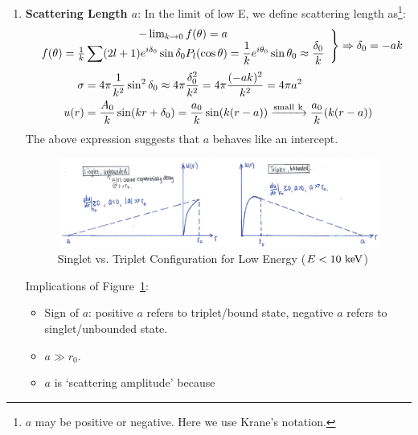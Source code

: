 \documentclass{school-22.101-notes}
\begin{document}
\begin{enumerate}
\item \textbf{Scattering Length $a$}: In the limit of low E, we define scattering length as\footnote{$a$ may be positive or negative. Here we use Krane's notation.}:
\begin{align}
\left. \begin{array}{c}
- \lim_{k\to 0} f(\theta) = a  \\
f(\theta) = \frac{1}{k} \displaystyle\sum (2l+1) e^{i \delta_0} \sin \delta_0  P_l (\cos \theta) = \frac{1}{k} e^{i\theta_0} \sin \theta_0  \approx \frac{\delta_0}{k} 
\end{array} 
\right\} \Rightarrow \delta_0 = -ak
\end{align}
\begin{align}
\sigma &= 4 \pi \frac{1}{k^2} \sin^2 \delta_0 \approx 4 \pi \frac{\delta_0^2}{k^2} =  4 \pi \frac{(-ak)^2}{k^2} = 4 \pi a^2 \\
u(r) &= \frac{A_0}{k} \sin(kr + \delta_0) = \frac{a_0}{k} \sin (k(r-a)) \xrightarrow{\mathrm{small \mbox{ } k}} \frac{a_0}{k} (k(r-a))
\end{align} 
The above expression suggests that $a$ behaves like an intercept.

\begin{figure}
    \includegraphics[width=7in]{images/scattering/s-wave-singlet-triplet.png}
    \caption{Singlet vs. Triplet Configuration for Low Energy ($E<10 \mbox{ } \mathrm{keV}$)\label{scattering-s-wave}}
\end{figure}
Implications of Figure~\ref{scattering-s-wave}:
\begin{itemize}
\item Sign of $a$:  positive $a$ refers to triplet/bound state, negative $a$ refers to singlet/unbounded state. 
\item $a \gg r_0$. 
\item $a$ is `scattering amplitude' because 
\end{itemize}
\end{enumerate}
\end{document}

